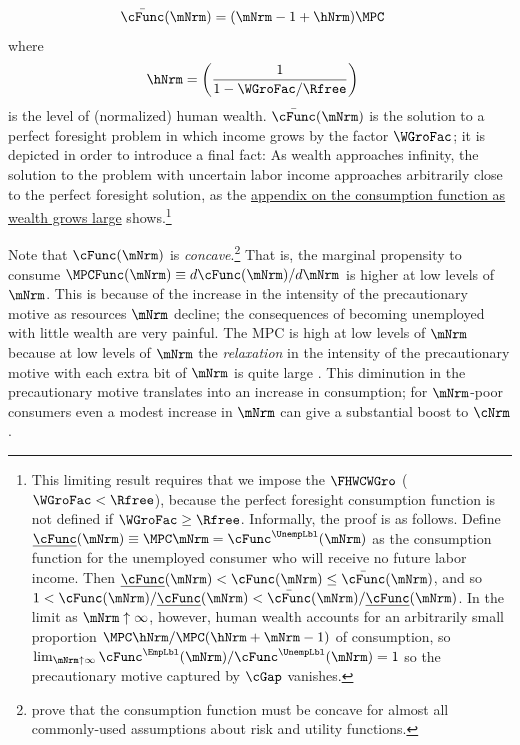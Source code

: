 \documentclass{econark}
\begin{document}
\begin{equation}\begin{gathered}\begin{aligned}
  \bar{\cFunc}(\mNrm) & =  (\mNrm-1+\hNrm)\MPC
\end{aligned}\end{gathered}\end{equation}
where
\begin{equation}\begin{gathered}\begin{aligned}
  \hNrm & =  \left(\frac{1}{1-\WGroFac/\Rfree}\right)
\end{aligned}\end{gathered}\end{equation}
is the level of (normalized) human wealth.  $\bar{\cFunc}(\mNrm)$ is the solution to a perfect foresight problem in which income grows by the factor $\WGroFac$; it is depicted in order to introduce a final fact: As wealth approaches infinity, the solution to the problem with uncertain labor income approaches arbitrarily close to the perfect foresight solution, as the \hyperref[sec:PGroGEQRfree]{appendix on the consumption function as wealth grows large} shows.\footnote{This limiting result requires that we impose the $\FHWCWGro$ ($\WGroFac < \Rfree$), because the perfect foresight consumption function is not defined if $\WGroFac \geq \Rfree$.  Informally, the proof is as follows.  Define $\underline{\cFunc}(\mNrm) \equiv \MPC\mNrm=\cFunc^{\UnempLbl}(\mNrm)$ as the consumption function for the unemployed consumer who will receive no future labor income.  Then $\underline{\cFunc}(\mNrm) < \cFunc(\mNrm) \leq \bar{\cFunc}(\mNrm)$, and so $1 < \cFunc(\mNrm)/\underline{\cFunc}(\mNrm)<\bar{\cFunc}(\mNrm)/\underline{\cFunc}(\mNrm)$. In the limit as $\mNrm \uparrow \infty$, however, human wealth accounts for an arbitrarily small proportion $\MPC \hNrm/\MPC (\hNrm+\mNrm-1)$ of consumption, so $\lim_{\mNrm \uparrow \infty} \cFunc^{\EmpLbl}(\mNrm)/\cFunc^{\UnempLbl}(\mNrm) = 1$ so the precautionary motive captured by $\cGap$ vanishes.}


Note that $\cFunc(\mNrm)$ is {\it concave}.\footnote{\cite{carroll&kimball:concavity} prove that the consumption
function must be concave for almost all commonly-used assumptions about
risk and utility functions.} That is, the marginal propensity to
consume $\MPCFunc(\mNrm) \equiv d \cFunc(\mNrm)/d \mNrm$ is higher at low levels of $\mNrm$.  This is because
of the increase in the intensity of the precautionary motive as resources
$\mNrm$ decline; the consequences of becoming unemployed with little wealth are very painful.  The MPC is high at low
levels of $\mNrm$ because at low levels of $\mNrm$ the {\it relaxation} in the
intensity of the precautionary motive with each extra bit of $\mNrm$ is quite large \citep{kimball:smallandlarge}.
This diminution in the precautionary motive translates into an increase
in consumption; for $\mNrm$-poor consumers even a modest increase in $\mNrm$ can
give a substantial boost to $\cNrm$.
\end{document}
